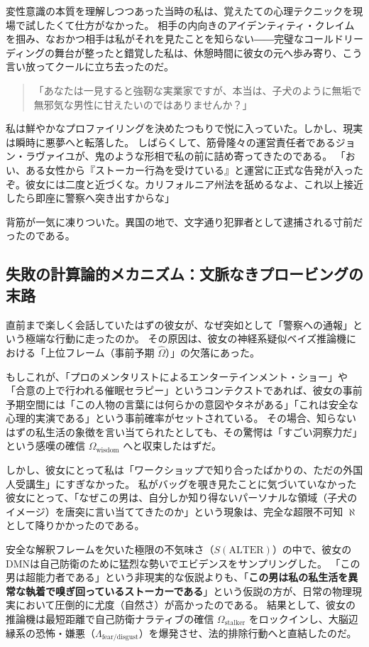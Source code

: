 変性意識の本質を理解しつつあった当時の私は、覚えたての心理テクニックを現場で試したくて仕方がなかった。
相手の内向きのアイデンティティ・クレイムを掴み、なおかつ相手は私がそれを見たことを知らない――完璧なコールドリーディングの舞台が整ったと錯覚した私は、休憩時間に彼女の元へ歩み寄り、こう言い放ってクールに立ち去ったのだ。
\begin{quote}
「あなたは一見すると強靭な実業家ですが、本当は、子犬のように無垢で無邪気な男性に甘えたいのではありませんか？」
\end{quote}

私は鮮やかなプロファイリングを決めたつもりで悦に入っていた。しかし、現実は瞬時に悪夢へと転落した。
しばらくして、筋骨隆々の運営責任者であるジョン・ラヴァイユが、鬼のような形相で私の前に詰め寄ってきたのである。
「おい、ある女性から『ストーカー行為を受けている』と運営に正式な告発が入ったぞ。彼女には二度と近づくな。カリフォルニア州法を舐めるなよ、これ以上接近したら即座に警察へ突き出すからな」

背筋が一気に凍りついた。異国の地で、文字通り犯罪者として逮捕される寸前だったのである。

\subsection{失敗の計算論的メカニズム：文脈なきプロービングの末路}
直前まで楽しく会話していたはずの彼女が、なぜ突如として「警察への通報」という極端な行動に走ったのか。
その原因は、彼女の神経系疑似ベイズ推論機における「上位フレーム（事前予期 $\hat{\Omega}$）」の欠落にあった。

もしこれが、「プロのメンタリストによるエンターテインメント・ショー」や「合意の上で行われる催眠セラピー」というコンテクストであれば、彼女の事前予期空間には「この人物の言葉には何らかの意図やタネがある」「これは安全な心理的実演である」という事前確率がセットされている。
その場合、知らないはずの私生活の象徴を言い当てられたとしても、その驚愕は「すごい洞察力だ」という感嘆の確信 $\Omega_{\mathrm{wisdom}}$ へと収束したはずだ。

しかし、彼女にとって私は「ワークショップで知り合ったばかりの、ただの外国人受講生」にすぎなかった。
私がバッグを覗き見たことに気づいていなかった彼女にとって、「なぜこの男は、自分しか知り得ないパーソナルな領域（子犬のイメージ）を唐突に言い当ててきたのか」という現象は、完全な超限不可知 $\aleph$ として降りかかったのである。

安全な解釈フレームを欠いた極限の不気味さ（$S(\mathrm{ALTER})$）の中で、彼女のDMNは自己防衛のために猛烈な勢いでエビデンスをサンプリングした。
「この男は超能力者である」という非現実的な仮説よりも、「\textbf{この男は私の私生活を異常な執着で嗅ぎ回っているストーカーである}」という仮説の方が、日常の物理現実において圧倒的に尤度（自然さ）が高かったのである。
結果として、彼女の推論機は最短距離で自己防衛ナラティブの確信 $\Omega_{\mathrm{stalker}}$ をロックインし、大脳辺縁系の恐怖・嫌悪（$\Lambda_{\mathrm{fear/disgust}}$）を爆発させ、法的排除行動へと直結したのだ。

